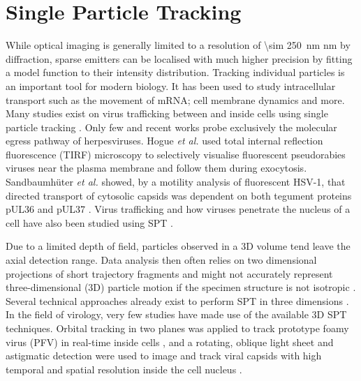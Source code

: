 \section{Single Particle Tracking}

While optical imaging is generally limited to a resolution of \SI{\sim 250}{\nano\metre} nm by diffraction, sparse emitters can be localised with much higher precision by fitting a model function to their intensity distribution.
Tracking individual particles is an important tool for modern biology.
It has been used to study intracellular transport such as the movement of mRNA\cite{Spille2015a}; cell membrane dynamics\cite{Cognet2014} and more.
Many studies exist on virus trafficking between and inside cells using single particle tracking \cite{(reviewed in [43])}.
Only few and recent works probe exclusively the molecular egress pathway of herpesviruses.
Hogue \emph{et al.} \cite{[16]} used total internal reflection fluorescence (TIRF) microscopy to selectively visualise fluorescent pseudorabies viruses near the plasma membrane and follow them during exocytosis.
Sandbaumhüter \emph{et al.} showed, by a motility analysis of fluorescent HSV-1, that directed transport of cytosolic capsids was dependent on both tegument proteins pUL36 and pUL37 \cite{[44]}.
Virus trafficking and how viruses penetrate the nucleus of a cell have also been studied using SPT \cite{Brandenburg2007}.

Due to a limited depth of field, particles observed in a 3D volume tend leave the axial detection range.
Data analysis then often relies on two dimensional projections of short trajectory fragments and might not accurately represent three-dimensional (3D) particle motion if the specimen structure is not isotropic \cite{[45]}.
Several technical approaches already exist to perform SPT in three dimensions \cite{[46-49]}.
In the field of virology, very few studies have made use of the available 3D SPT techniques.%
Orbital tracking in two planes was applied to track prototype foamy virus (PFV) in real-time inside cells \cite{[50]}, and a rotating, oblique light sheet and astigmatic detection were used to image and track viral capsids with high temporal and spatial resolution inside the cell nucleus \cite{[19]}.

